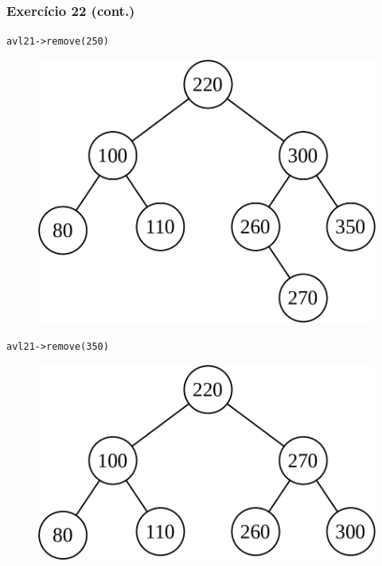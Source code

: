 \documentclass[aspectratio=169]{beamer}
\begin{document}
\begin{frame}[fragile]\frametitle{Exercício 22 (cont.)}
\texttt{avl21-\textgreater{}remove(250)}
\begin{figure}[h]
	\centering
	\includegraphics[height=0.25\paperheight]{imagens/avl-exercicio22h.png}
\end{figure}
\texttt{avl21-\textgreater{}remove(350)}
\begin{figure}[h]
	\centering
	\includegraphics[height=0.18\paperheight]{imagens/avl-exercicio22i.png}
\end{figure}
\end{frame}

\end{document}
